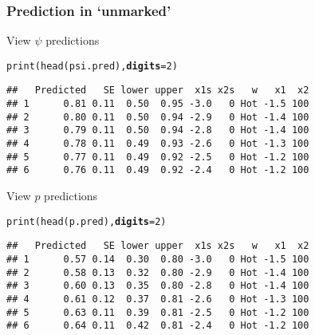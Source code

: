 \documentclass[color=usenames,dvipsnames]{beamer}\usepackage[]{graphicx}\usepackage[]{xcolor}
\makeatletter
\newcommand{\hlnum}[1]{\textcolor[rgb]{0.69,0.494,0}{#1}}%
\newcommand{\hlstd}[1]{\textcolor[rgb]{0,0,0}{#1}}%
\newcommand{\hlkwc}[1]{\textcolor[rgb]{0,0,0}{\textbf{#1}}}%
\newcommand{\hlkwd}[1]{\textcolor[rgb]{0.004,0.004,0.506}{#1}}%
\newenvironment{kframe}{%
 \def\at@end@of@kframe{}%
 \ifinner\ifhmode%
  \def\at@end@of@kframe{\end{minipage}}%
  \begin{minipage}{\columnwidth}%
 \fi\fi%
 \def\FrameCommand##1{\hskip\@totalleftmargin \hskip-\fboxsep
 \colorbox{shadecolor}{##1}\hskip-\fboxsep
     \hskip-\linewidth \hskip-\@totalleftmargin \hskip\columnwidth}%
 \MakeFramed {\advance\hsize-\width
   \@totalleftmargin\z@ \linewidth\hsize
   \@setminipage}}%
 {\par\unskip\endMakeFramed%
 \at@end@of@kframe}
\newenvironment{knitrout}{}{} %
\makeatother
\begin{document}
\begin{frame}[fragile]
  \frametitle{Prediction in `unmarked'}
  \small
  View $\psi$ predictions
\begin{knitrout}\footnotesize
{}\color{fgcolor}\begin{kframe}
\begin{alltt}
\hlkwd{print}\hlstd{(}\hlkwd{head}\hlstd{(psi.pred),} \hlkwc{digits}\hlstd{=}\hlnum{2}\hlstd{)}
\end{alltt}
\begin{verbatim}
##   Predicted   SE lower upper  x1s x2s   w   x1  x2
## 1      0.81 0.11  0.50  0.95 -3.0   0 Hot -1.5 100
## 2      0.80 0.11  0.50  0.94 -2.9   0 Hot -1.4 100
## 3      0.79 0.11  0.50  0.94 -2.8   0 Hot -1.4 100
## 4      0.78 0.11  0.49  0.93 -2.6   0 Hot -1.3 100
## 5      0.77 0.11  0.49  0.92 -2.5   0 Hot -1.2 100
## 6      0.76 0.11  0.49  0.92 -2.4   0 Hot -1.2 100
\end{verbatim}
\end{kframe}
\end{knitrout}
\pause
\vfill
  View $p$ predictions
\begin{knitrout}\footnotesize
{}\color{fgcolor}\begin{kframe}
\begin{alltt}
\hlkwd{print}\hlstd{(}\hlkwd{head}\hlstd{(p.pred),} \hlkwc{digits}\hlstd{=}\hlnum{2}\hlstd{)}
\end{alltt}
\begin{verbatim}
##   Predicted   SE lower upper  x1s x2s   w   x1  x2
## 1      0.57 0.14  0.30  0.80 -3.0   0 Hot -1.5 100
## 2      0.58 0.13  0.32  0.80 -2.9   0 Hot -1.4 100
## 3      0.60 0.13  0.35  0.80 -2.8   0 Hot -1.4 100
## 4      0.61 0.12  0.37  0.81 -2.6   0 Hot -1.3 100
## 5      0.63 0.11  0.39  0.81 -2.5   0 Hot -1.2 100
## 6      0.64 0.11  0.42  0.81 -2.4   0 Hot -1.2 100
\end{verbatim}
\end{kframe}
\end{knitrout}
\end{frame}
\end{document}

